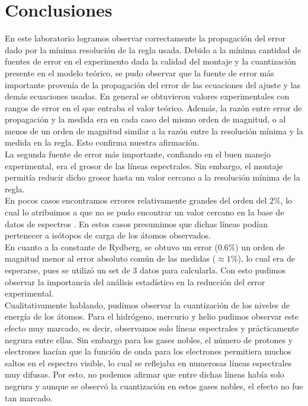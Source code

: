 \documentclass[%
 reprint,
 amsmath,amssymb,
 aps,
]{revtex4-1}
\begin{document}
\section{\label{sec:level1}Conclusiones}
En este laboratorio logramos observar correctamente la propagación del error dado por la mínima resolución de la regla usada. Debido a la mínima cantidad de fuentes de error en el experimento dada la calidad del montaje y la cuantización presente en el modelo teórico, se pudo observar que la fuente de error más importante provenía de la propagación del error de las ecuaciones del ajuste y las demás ecuaciones usadas. En general se obtuvieron valores experimentales con rangos de error en el que entraba el valor teórico. Además, la razón entre error de propagación y la medida era en cada caso del mismo orden de magnitud, o al menos de un orden de magnitud similar a la razón entre la resolución mínima y la medida en la regla. Esto confirma nuestra afirmación.\\

La segunda fuente de error más importante, confiando en el buen manejo experimental, era el grosor de las líneas espectrales. Sin embargo, el montaje permitía reducir dicho grosor hasta un valor cercano a la resolución mínima de la regla.\\

En pocos casos encontramos errores relativamente grandes del orden del $2\%$, lo cual lo atribuimos a que no se pudo encontrar un valor cercano en la base de datos de espectros \cite{base}. En estos casos presumimos que dichas líneas podían pertenecer a isótopos de carga de los átomos observados.\\

En cuanto a la constante de Rydberg, se obtuvo un error ($0.6\%$) un orden de magnitud menor al error absoluto común de las medidas ($\approx 1\%$), lo cual era de esperarse, pues se utilizó un set de 3 datos para calcularla. Con esto pudimos observar la importancia del análisis estadístico en la reducción del error experimental.\\

Cualitativamente hablando, pudimos observar la cuantización de los niveles de energía de los átomos. Para el hidrógeno, mercurio y helio pudimos observar este efecto muy marcado, es decir, observamos solo líneas espectrales y prácticamente negrura entre ellas. Sin embargo para los gases nobles, el número de protones y electrones hacían que la función de onda para los electrones permitiera muchos saltos en el espectro visible, lo cual se reflejaba en numerosas líneas espectrales muy difusas. Por esto, no podemos afirmar que entre dichas líneas había solo negrura y aunque se observó la cuantización en estos gases nobles, el efecto no fue tan marcado.\\
\end{document}
